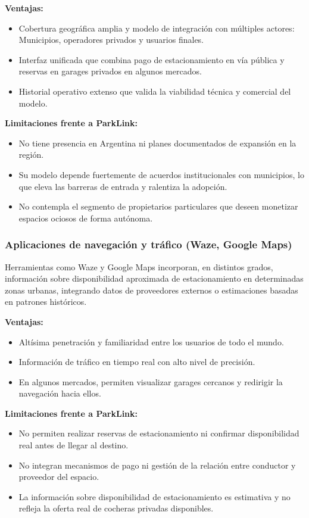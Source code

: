 \textbf{Ventajas:}
\begin{itemize}
    \item Cobertura geográfica amplia y modelo de integración con múltiples actores: Municipios, operadores privados y usuarios finales.
    \item Interfaz unificada que combina pago de estacionamiento en vía pública y reservas en garages privados en algunos mercados.
    \item Historial operativo extenso que valida la viabilidad técnica y comercial del modelo.
\end{itemize}

\textbf{Limitaciones frente a ParkLink:}
\begin{itemize}
    \item No tiene presencia en Argentina ni planes documentados de expansión en la región.
    \item Su modelo depende fuertemente de acuerdos institucionales con municipios, lo que eleva las barreras de entrada y ralentiza la adopción.
    \item No contempla el segmento de propietarios particulares que deseen monetizar espacios ociosos de forma autónoma.
\end{itemize}

\subsubsection{Aplicaciones de navegación y tráfico (Waze, Google Maps)}

Herramientas como Waze \autocite{waze} y Google Maps \autocite{googlemaps} incorporan, en distintos grados, información sobre disponibilidad aproximada de estacionamiento en determinadas zonas urbanas, integrando datos de proveedores externos o estimaciones basadas en patrones históricos.

\textbf{Ventajas:}
\begin{itemize}
    \item Altísima penetración y familiaridad entre los usuarios de todo el mundo.
    \item Información de tráfico en tiempo real con alto nivel de precisión.
    \item En algunos mercados, permiten visualizar garages cercanos y redirigir la navegación hacia ellos.
\end{itemize}

\textbf{Limitaciones frente a ParkLink:}
\begin{itemize}
    \item No permiten realizar reservas de estacionamiento ni confirmar disponibilidad real antes de llegar al destino.
    \item No integran mecanismos de pago ni gestión de la relación entre conductor y proveedor del espacio.
    \item La información sobre disponibilidad de estacionamiento es estimativa y no refleja la oferta real de cocheras privadas disponibles.
\end{itemize}


